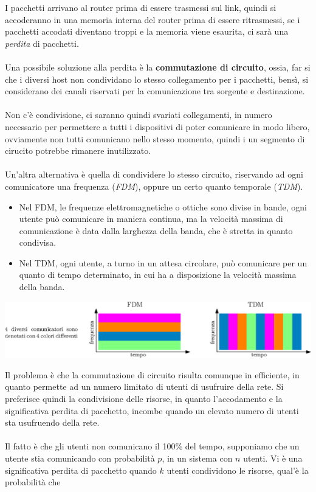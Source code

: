 \documentclass[12pt, letterpaper]{article}
\newcommand{\acc}{\\\hphantom{}\\}
\begin{document}
I pacchetti arrivano al router prima di essere trasmessi sul link, quindi si accoderanno in una memoria interna del router prima
di essere ritrasmessi, se i pacchetti accodati diventano troppi e la memoria viene esaurita, ci sarà una \textit{perdita} di
pacchetti. \acc
Una possibile soluzione alla perdita è la \textbf{commutazione di circuito}, ossia, far si che i diversi host non condividano lo
stesso collegamento per i pacchetti, bensì, si considerano dei canali riservati per la comunicazione tra sorgente e destinazione.\acc
Non c'è condivisione, ci saranno quindi svariati collegamenti, in numero necessario per permettere a tutti i dispositivi di
poter comunicare in modo libero, ovviamente non tutti comunicano nello stesso momento, quindi i un segmento di cirucito potrebbe
rimanere inutilizzato.\acc
Un'altra alternativa è quella di condividere lo stesso circuito, riservando ad ogni comunicatore una frequenza (\textit{FDM}), oppure un certo
quanto temporale (\textit{TDM}).\begin{itemize}
    \item Nel FDM, le frequenze elettromagnetiche o ottiche sono divise in bande, ogni utente può comunicare in maniera continua,
          ma la velocità massima di comunicazione è data dalla larghezza della banda, che è stretta in quanto condivisa.
    \item Nel TDM, ogni utente, a turno in un attesa circolare, può comunicare per un quanto di tempo determinato, in cui ha a
          disposizione la velocità massima della banda.
\end{itemize}\begin{center}
    \includegraphics[width=1\textwidth ]{images/FdmTdm.eps}
\end{center}
Il problema è che la commutazione di circuito risulta comunque in efficiente, in quanto permette ad un numero
limitato di utenti di usufruire della rete. Si preferisce quindi la condivisione delle risorse, in quanto l'accodamento e la
significativa perdita di pacchetto, incombe quando un elevato numero di utenti sta usufruendo della rete.\acc
Il fatto è che gli utenti non comunicano il 100\% del tempo, supponiamo che un utente stia comunicando con probabilità $p$, in un
sistema con $n$ utenti. Vi è una significativa perdita di pacchetto quando $k$ utenti condividono le risorse, qual'è la probabilità che
\end{document}
